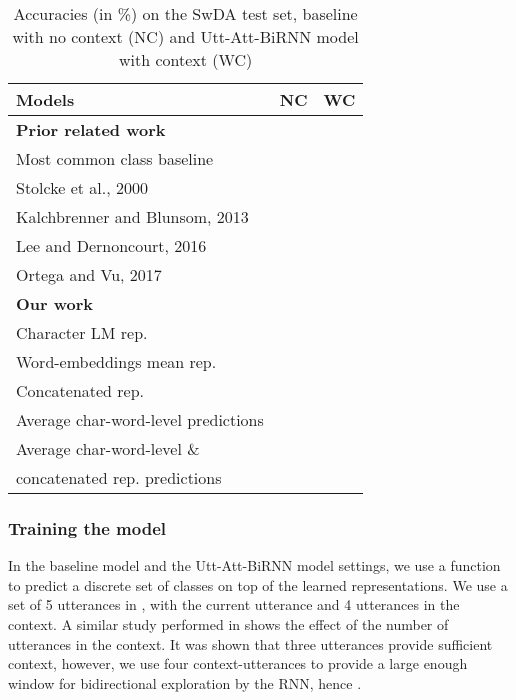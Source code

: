 \documentclass[a4paper]{article}
\begin{document}
\begin{table}[b]
  \caption{Accuracies (in \%) on the SwDA test set, baseline with no context (NC) and Utt-Att-BiRNN model with context (WC)}
  \label{tab:accOnSwDA}
  \centering
  \begin{tabular}{ lll }
    \toprule
    \textbf{Models}       & \textbf{NC}  & \textbf{WC}  \\
\midrule
\textbf{Prior related work}    &    &  \\
    Most common class baseline        & ~~~    &  \\
    Stolcke et al., 2000 \cite{stolcke2000dialogue} & ~~~ &    \\
    Kalchbrenner and Blunsom, 2013 \cite{kalchbrenner2013recurrent} & & ~~~ \\
    Lee and Dernoncourt, 2016 \cite{lee2016sequential} & & ~~~ \\
    Ortega and Vu, 2017 \cite{ortega2017neural} & & ~~~ \\
    \textbf{Our work}    &    &  \\
    Character LM rep. &   ~~~  & ~~~ \\
    Word-embeddings mean rep.  & ~~~ & ~~~ \\
    Concatenated rep.  & ~~~  &  ~~~  \\
    Average char-word-level predictions  & ~~~ & ~~~ \\
 
    Average char-word-level \&        &    &    \\
    concatenated rep. predictions & ~~~ & \textbf{~~~} \\
    \bottomrule
  \end{tabular}
\end{table}


\subsubsection{Training the model} 

In the baseline model and the Utt-Att-BiRNN model settings, we use a  function to predict a discrete set of classes  on top of the learned  representations. 
We use a set of 5 utterances in , with the current utterance and 4 utterances in the context. 
A similar study performed in \cite{BOTHE18_525} shows the effect of the number of utterances in the context. It was shown that three utterances provide sufficient context, however, we use four context-utterances to provide a large enough window for bidirectional exploration by the RNN, hence .
\end{document}
